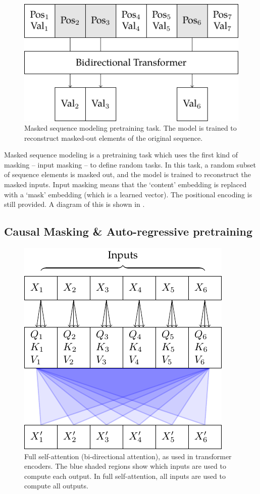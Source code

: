 \begin{figure}
    \centering
    \includegraphics{figures/pretraining-msm.pdf}
    \caption[Masked Sequence Modeling Pretraining]{Masked sequence modeling pretraining task. The model is trained to reconstruct masked-out elements of the original sequence.}
    \hrulefill
    \label{fig:pretraining-msm}
\end{figure}

Masked sequence modeling is a pretraining task which uses the first kind of masking -- input masking -- to define random tasks. In this task, a random subset of sequence elements is masked out, and the model is trained to reconstruct the masked inputs. Input masking means that the `content' embedding is replaced with a `mask' embedding (which is a learned vector). The positional encoding is still provided. A diagram of this is shown in .

\subsection{Causal Masking \& Auto-regressive pretraining}
\label{ss:autoreg-pretraining}

\begin{figure}
    \centering
    \includegraphics[]{figures/attn-1-self.pdf}
    \caption[Self-attention]{Full self-attention (bi-directional attention), as used in transformer encoders. The blue shaded regions show which inputs are used to compute each output. In full self-attention, all inputs are used to compute all outputs.}
    \label{fig:self-attn}
\end{figure}

